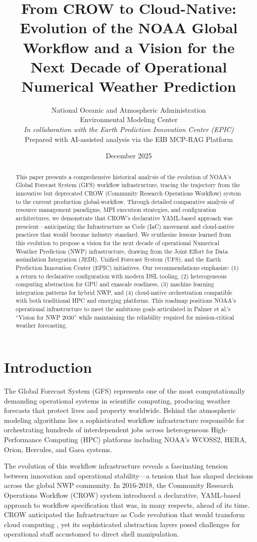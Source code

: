 \documentclass[11pt,twocolumn]{article}
\title{From CROW to Cloud-Native: \\
\large Evolution of the NOAA Global Workflow and a Vision for the Next Decade of Operational Numerical Weather Prediction}
\author{
  National Oceanic and Atmospheric Administration \\
  Environmental Modeling Center \\
  \textit{In collaboration with the Earth Prediction Innovation Center (EPIC)} \\
  \vspace{0.5em}
  {\small Prepared with AI-assisted analysis via the EIB MCP-RAG Platform}
}
\date{December 2025}
\begin{document}
\maketitle

\begin{abstract}
This paper presents a comprehensive historical analysis of the evolution of NOAA's Global Forecast System (GFS) workflow infrastructure, tracing the trajectory from the innovative but deprecated CROW (Community Research Operations Workflow) system to the current production global-workflow. Through detailed comparative analysis of resource management paradigms, MPI execution strategies, and configuration architectures, we demonstrate that CROW's declarative YAML-based approach was prescient---anticipating the Infrastructure as Code (IaC) movement and cloud-native practices that would become industry standard. We synthesize lessons learned from this evolution to propose a vision for the next decade of operational Numerical Weather Prediction (NWP) infrastructure, drawing from the Joint Effort for Data assimilation Integration (JEDI), Unified Forecast System (UFS), and the Earth Prediction Innovation Center (EPIC) initiatives. Our recommendations emphasize: (1) a return to declarative configuration with modern DSL tooling, (2) heterogeneous computing abstraction for GPU and exascale readiness, (3) machine learning integration patterns for hybrid NWP, and (4) cloud-native orchestration compatible with both traditional HPC and emerging platforms. This roadmap positions NOAA's operational infrastructure to meet the ambitious goals articulated in Palmer et al.'s ``Vision for NWP 2030'' while maintaining the reliability required for mission-critical weather forecasting.
\end{abstract}

\section{Introduction}

The Global Forecast System (GFS) represents one of the most computationally demanding operational systems in scientific computing, producing weather forecasts that protect lives and property worldwide. Behind the atmospheric modeling algorithms lies a sophisticated workflow infrastructure responsible for orchestrating hundreds of interdependent jobs across heterogeneous High-Performance Computing (HPC) platforms including NOAA's WCOSS2, HERA, Orion, Hercules, and Gaea systems.

The evolution of this workflow infrastructure reveals a fascinating tension between innovation and operational stability---a tension that has shaped decisions across the global NWP community. In 2016-2018, the Community Research Operations Workflow (CROW) system introduced a declarative, YAML-based approach to workflow specification that was, in many respects, ahead of its time. CROW anticipated the Infrastructure as Code revolution that would transform cloud computing \cite{rahman2018iac_gaps}, yet its sophisticated abstraction layers posed challenges for operational staff accustomed to direct shell manipulation.
\end{document}
